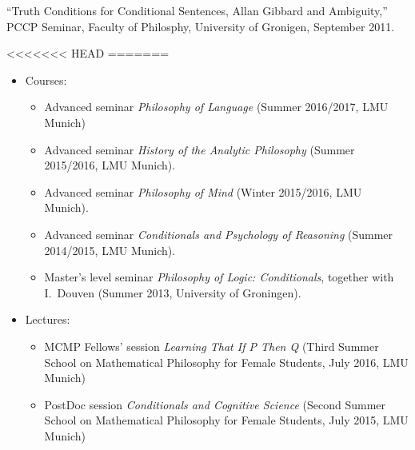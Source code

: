 \documentclass[11pt,article,oneside]{memoir}
\begin{document}
\begin{itemize}
\begin{itemize}
    \ind ``Truth Conditions for Conditional Sentences, Allan Gibbard and Ambiguity,'' PCCP Seminar, Faculty of
    Philosphy, University of Gronigen, September 2011.
    
  


\bigskip 

<<<<<<< HEAD
\medskip
=======
  
  
  \begin{itemize}
    \item Courses:
      \begin{itemize}
      	\item Advanced seminar \emph{Philosophy of Language} (Summer 2016/2017, LMU Munich)
        \item Advanced seminar \emph{History of the Analytic Philosophy} (Summer 2015/2016, LMU Munich).
        \item Advanced seminar \emph{Philosophy of Mind} (Winter 2015/2016, LMU Munich).
        \item Advanced seminar \emph{Conditionals and Psychology of Reasoning} (Summer 2014/2015, LMU Munich).
        \item Master's level seminar \emph{Philosophy of Logic: Conditionals}, together with I.~Douven (Summer 2013, University of Groningen).
     \end{itemize}
    \item Lectures:
      \begin{itemize}
         \item MCMP Fellows' session \emph{Learning That If P Then Q} (Third Summer School on Mathematical Philosophy for Female Students, July 2016, LMU Munich)
         \item PostDoc session \emph{Conditionals and Cognitive Science} (Second Summer School on Mathematical Philosophy for Female Students, July 2015, LMU Munich)
      \end{itemize}
  \end{itemize}
  

\end{itemize}
\end{itemize}
\end{document}

